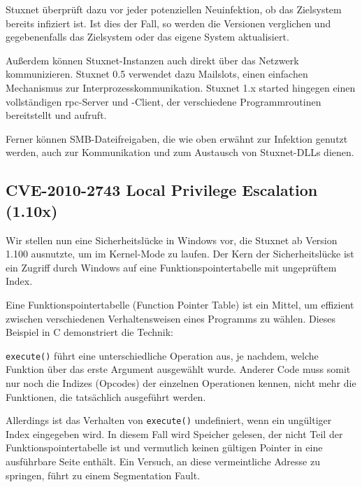 \documentclass[a4paper]{article}
\begin{document}
Stuxnet überprüft dazu vor jeder potenziellen Neuinfektion, ob das Zielsystem bereits infiziert ist.
Ist dies der Fall, so werden die Versionen verglichen und gegebenenfalls das Zielsystem oder das eigene System aktualisiert.

Außerdem können Stuxnet-Instanzen auch direkt über das Netzwerk kommunizieren.
Stuxnet 0.5 verwendet dazu Mailslots, einen einfachen Mechanismus zur Interprozesskommunikation.
Stuxnet 1.x started hingegen einen vollständigen \gls{rpc}-Server und -Client, %
der verschiedene Programmroutinen bereitstellt und aufruft.

Ferner können SMB-Dateifreigaben, die wie oben erwähnt zur Infektion genutzt werden,
auch zur Kommunikation und zum Austausch von Stuxnet-DLLs dienen.

\subsection{CVE-2010-2743 Local Privilege Escalation (1.10x)}

Wir stellen nun eine Sicherheitslücke in Windows vor, die Stuxnet ab Version 1.100 ausnutzte, um im Kernel-Mode zu laufen.
Der Kern der Sicherheitslücke ist ein Zugriff durch Windows auf eine Funktionspointertabelle mit ungeprüftem Index.

Eine Funktionspointertabelle (Function Pointer Table) ist ein Mittel,
um effizient zwischen verschiedenen Verhaltensweisen eines Programms zu wählen.
Dieses Beispiel in C demonstriert die Technik:



\texttt{execute()} führt eine unterschiedliche Operation aus, je nachdem, welche Funktion über das erste Argument ausgewählt wurde.
Anderer Code muss somit nur noch die Indizes (Opcodes) der einzelnen Operationen kennen, nicht mehr die Funktionen, die tatsächlich ausgeführt werden.

Allerdings ist das Verhalten von \texttt{execute()} undefiniert, wenn ein ungültiger Index eingegeben wird.
In diesem Fall wird Speicher gelesen, der nicht Teil der Funktionspointertabelle ist und vermutlich keinen gültigen Pointer in eine ausführbare Seite enthält.
Ein Versuch, an diese vermeintliche Adresse zu springen, führt zu einem Segmentation Fault.


\end{document}
